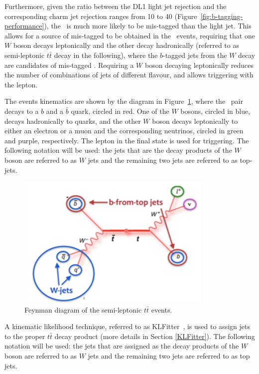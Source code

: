 \documentclass[letterpaper,12pt]{article}
\begin{document}
Furthermore, given the ratio between the DL1 light jet rejection and the corresponding charm jet rejection 
ranges from 10 to 40 (Figure~\ref{fig:b-tagging-performance}), the 
\cjet\ is much more likely to be mis-tagged than the light jet. 
This allows for a source of mis-tagged \cjets to be obtained in the \ttbar\ events, 
requiring that one $W$ boson decays leptonically and the other decay hadronically 
(referred to as semi-leptonic $t\bar{t}$ decay in the following),
where the $b$-tagged jets from the $W$ decay are candidates of mis-tagged \cjets.
Requiring a $W$ boson decaying leptonically 
reduces the number of combinations of jets of different flavour, 
and allows triggering with the lepton.

The events kinematics are shown by the diagram in 
Figure~\ref{fig:feynman}, where the \ttbar\ pair decays to a 
$b$ and a $\bar{b}$ quark, circled in red. One of the $W$ bosons, 
circled in blue, decays hadronically to quarks, 
and the other $W$ boson decays leptonically to either 
an electron or a muon and the corresponding neutrinos, 
circled in green and purple, respectively. 
The lepton in the final state is used for triggering.
The following notation will be used: the jets that are
the decay products of the $W$ boson are referred to as
$W$ jets and the remaining two jets are referred to as top-jets.

\begin{figure}[H]
\centering
\includegraphics[width=.45\textwidth]{FTAG_plots/feynman.png}
\caption{Feynman diagram of the semi-leptonic $t\bar{t}$ events.}
\label{fig:feynman}
\end{figure}


A kinematic likelihood technique, referred to as 
KLFitter~\cite{ERDMANN201418}, is used to assign jets to the proper $t\bar{t}$ decay product 
(more details in Section \ref{KLFitter}). 
The following notation will be used: the jets that are
assigned as the decay products of the $W$ boson are referred to as
$W$ jets and the remaining two jets are referred to as top jets.
\end{document}
